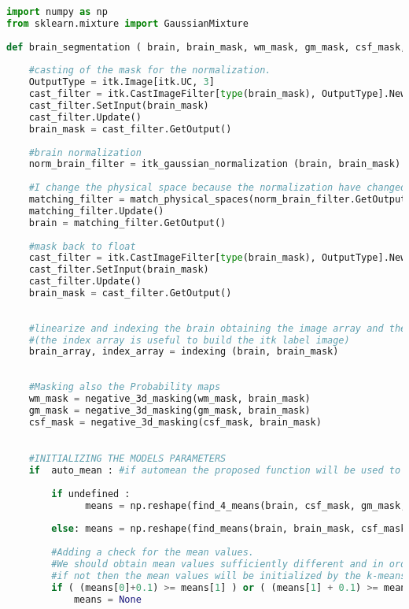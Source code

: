 \documentclass{standalone}
\begin{document}
\lstset{style=python}
	\begin{lstlisting}[language = python, caption = Segmentation pipeline, label =segmentation]
import numpy as np
from sklearn.mixture import GaussianMixture
 
def brain_segmentation ( brain, brain_mask, wm_mask, gm_mask, csf_mask, auto_mean = False, undefined = False, proba = False ):
    
    #casting of the mask for the normalization.
    OutputType = itk.Image[itk.UC, 3]
    cast_filter = itk.CastImageFilter[type(brain_mask), OutputType].New()
    cast_filter.SetInput(brain_mask)
    cast_filter.Update()
    brain_mask = cast_filter.GetOutput()
    
    #brain normalization
    norm_brain_filter = itk_gaussian_normalization (brain, brain_mask)
    
    #I change the physical space because the normalization have changed it.
    matching_filter = match_physical_spaces(norm_brain_filter.GetOutput(), brain)
    matching_filter.Update()
    brain = matching_filter.GetOutput()
    
    #mask back to float
    cast_filter = itk.CastImageFilter[type(brain_mask), OutputType].New()
    cast_filter.SetInput(brain_mask)
    cast_filter.Update()
    brain_mask = cast_filter.GetOutput()
    
    
    #linearize and indexing the brain obtaining the image array and the index array
    #(the index array is useful to build the itk label image)
    brain_array, index_array = indexing (brain, brain_mask)
    
    
    #Masking also the Probability maps
    wm_mask = negative_3d_masking(wm_mask, brain_mask)
    gm_mask = negative_3d_masking(gm_mask, brain_mask)
    csf_mask = negative_3d_masking(csf_mask, brain_mask)

    
    #INITIALIZING THE MODELS PARAMETERS    
    if  auto_mean : #if automean the proposed function will be used to find the means values
    
        if undefined :
              means = np.reshape(find_4_means(brain, csf_mask, gm_mask, wm_mask), (-1,1))
            
        else: means = np.reshape(find_means(brain, brain_mask, csf_mask, gm_mask, wm_mask), (-1,1))
                
        #Adding a check for the mean values. 
        #We should obtain mean values sufficiently different and in order csf < gm < wm.
        #if not then the mean values will be initialized by the k-means++ algorithm of Scikit-Learn
        if ( (means[0]+0.1) >= means[1] ) or ( (means[1] + 0.1) >= means[2] ) :
            means = None
    

\end{lstlisting}
\end{document}
